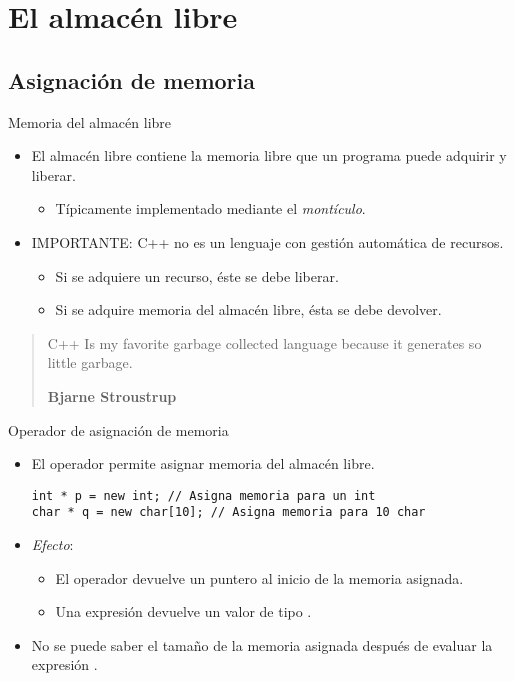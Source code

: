 \section{El almacén libre}

\subsection{Asignación de memoria}

\begin{frame}{Memoria del almacén libre}
\begin{itemize}
  \item El \alert{almacén libre} contiene la memoria libre que un programa
        puede adquirir y liberar.
    \begin{itemize}
      \item Típicamente implementado mediante el \emph{montículo}.
    \end{itemize}
  \item \alert{IMPORTANTE}: C++ no es un lenguaje con gestión automática de recursos.
    \begin{itemize}
      \item Si se adquiere un recurso, éste se debe liberar.
      \item Si se adquire memoria del almacén libre, ésta se debe devolver.
    \end{itemize}
\end{itemize}
\begin{quote}
C++ Is my favorite garbage collected language because it generates so little garbage.

\textbf{Bjarne Stroustrup}
\end{quote}
\end{frame}

\begin{frame}[fragile]{Operador de asignación de memoria}
\begin{itemize}
  \item El operador  permite asignar memoria del almacén libre.
\begin{lstlisting}
int * p = new int; // Asigna memoria para un int
char * q = new char[10]; // Asigna memoria para 10 char
\end{lstlisting}
  \item \emph{Efecto}:
    \begin{itemize}
      \item El operador  devuelve un puntero al inicio de la memoria asignada.
      \item Una expresión   devuelve un valor de tipo .
    \end{itemize}
  \item No se puede saber el tamaño de la memoria asignada después de evaluar la expresión .
\end{itemize}
\end{frame}

